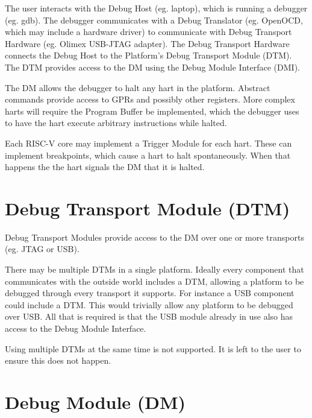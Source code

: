 \documentclass{article}
\begin{document}
The user interacts with the Debug Host (eg. laptop), which is running a
debugger (eg. gdb).  The debugger communicates with a Debug Translator (eg.
OpenOCD, which may include a hardware driver) to communicate with Debug
Transport Hardware (eg.  Olimex USB-JTAG adapter).
The Debug Transport Hardware connects the Debug Host to the Platform's Debug
Transport Module (DTM).  The DTM provides access to the DM using the Debug
Module Interface (DMI).

The DM allows the debugger to halt any hart in the platform. Abstract commands
provide access to GPRs and possibly other registers. More complex harts will
require the Program Buffer be implemented, which the debugger uses to have the
hart execute arbitrary instructions while halted.

Each RISC-V core may implement a Trigger Module for each hart.  These can
implement breakpoints, which cause a hart to halt spontaneously.  When that
happens the the hart signals the DM that it is halted.

\section{Debug Transport Module (DTM)}

Debug Transport Modules provide access to the DM over one or more transports
(eg. JTAG or USB).

There may be multiple DTMs in a single platform. Ideally every component that
communicates with the outside world includes a DTM, allowing a platform to be
debugged through every transport it supports.  For instance a USB component
could include a DTM. This would trivially allow any platform to be debugged
over USB. All that is required is that the USB module already in use also has
access to the Debug Module Interface.

Using multiple DTMs at the same time is not supported. It is left to the user
to ensure this does not happen.

\section{Debug Module (DM)} \label{dm}
\end{document}
